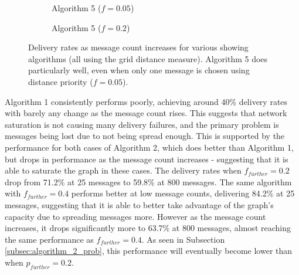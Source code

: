 \documentclass[bsc,frontabs,twoside,singlespacing,parskip,deptreport]{infthesis}     %
\begin{document}
\begin{figure}
\begin{subfigure}[]{0.49\textwidth}
\caption{Algorithm 5 ($f=0.05$)}
\end{subfigure}
%
\begin{subfigure}[]{0.49\textwidth}
\caption{Algorithm 5 ($f=0.2$)}
\end{subfigure}
\caption{Delivery rates as message count increases for various showing algorithms (all using the grid distance measure). Algorithm 5 does particularly well, even when only one message is chosen using distance priority ($f=0.05$).}
\label{fig:all_show_models}
\end{figure}

Algorithm 1 consistently performs poorly, achieving around 40\% delivery rates with barely any change as the message count rises. This suggests that network saturation is not causing many delivery failures, and the primary problem is messages being lost due to not being spread enough. This is supported by the performance for both cases of Algorithm 2, which does better than Algorithm 1, but drops in performance as the message count increases - suggesting that it is able to saturate the graph in these cases. The delivery rates when $f_{further}=0.2$ drop from 71.2\% at 25 messages to 59.8\% at 800 messages. The same algorithm with $f_{further}=0.4$ performs better at low message counts, delivering 84.2\% at 25 messages, suggesting that it is able to better take advantage of the graph's capacity due to spreading messages more. However as the message count increases, it drops significantly more to 63.7\% at 800 messages, almost reaching the same performance as $f_{further}=0.4$. As seen in Subsection \ref{subsec:algorithm_2_prob}, this performance will eventually become lower than when $p_{further}=0.2$.
\end{document}
